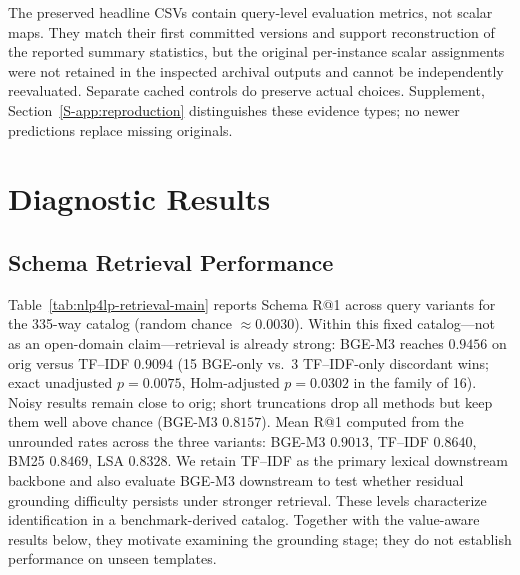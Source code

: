 \documentclass[pdflatex,sn-basic,Numbered]{sn-jnl}
\begin{document}
The preserved headline CSVs contain query-level evaluation metrics, not scalar maps. They match their first committed versions and support reconstruction of the reported summary statistics, but the original per-instance scalar assignments were not retained in the inspected archival outputs and cannot be independently reevaluated. Separate cached controls do preserve actual choices. Supplement, Section~\ref{S-app:reproduction} distinguishes these evidence types; no newer predictions replace missing originals.



\section{Diagnostic Results}
\label{sec:experiments}
\subsection{Schema Retrieval Performance}
\label{subsec:exp_retrieval}

Table~\ref{tab:nlp4lp-retrieval-main} reports Schema R@1 across query variants for the 335-way catalog (random chance $\approx 0.0030$). Within this fixed catalog---not as an open-domain claim---retrieval is already strong: BGE-M3 reaches $0.9456$ on orig versus TF--IDF $0.9094$ (15 BGE-only vs.\ 3 TF--IDF-only discordant wins; exact unadjusted $p=0.0075$, Holm-adjusted $p=0.0302$ in the family of 16). Noisy results remain close to orig; short truncations drop all methods but keep them well above chance (BGE-M3 $0.8157$). Mean R@1 computed from the unrounded rates across the three variants: BGE-M3 $0.9013$, TF--IDF $0.8640$, BM25 $0.8469$, LSA $0.8328$. We retain TF--IDF as the primary lexical downstream backbone and also evaluate BGE-M3 downstream to test whether residual grounding difficulty persists under stronger retrieval. These levels characterize identification in a benchmark-derived catalog. Together with the value-aware results below, they motivate examining the grounding stage; they do not establish performance on unseen templates.
\end{document}
